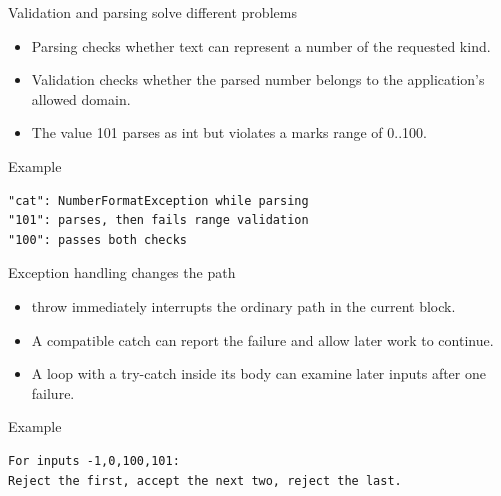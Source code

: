 \documentclass[10pt,aspectratio=169]{beamer}
\begin{document}
\begin{frame}[fragile,t]{Validation and parsing solve different problems}
\begin{itemize}
\item Parsing checks whether text can represent a number of the requested kind.
\item Validation checks whether the parsed number belongs to the application's allowed domain.
\item The value 101 parses as int but violates a marks range of 0..100.
\end{itemize}
\vspace{1mm}\begin{block}{Example}
\begin{lstlisting}
"cat": NumberFormatException while parsing
"101": parses, then fails range validation
"100": passes both checks
\end{lstlisting}
\end{block}
\end{frame}

\begin{frame}[fragile,t]{Exception handling changes the path}
\begin{itemize}
\item throw immediately interrupts the ordinary path in the current block.
\item A compatible catch can report the failure and allow later work to continue.
\item A loop with a try-catch inside its body can examine later inputs after one failure.
\end{itemize}
\vspace{1mm}\begin{block}{Example}
\begin{lstlisting}
For inputs -1,0,100,101:
Reject the first, accept the next two, reject the last.
\end{lstlisting}
\end{block}
\end{frame}
\end{document}
